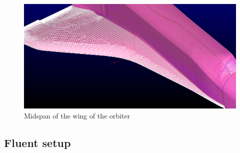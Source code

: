 \begin{figure}[H]
 \centering
 \includegraphics[width=\textwidth]{report_images/ss_wing_LE.png}
 \caption{Midspan of the wing of the orbiter}
 \label{fig: ss_wing_LE}
\end{figure}


\subsection{Fluent setup}

%
%
%
%



